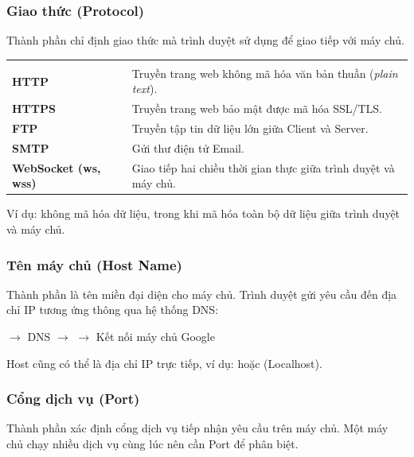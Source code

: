 \subsubsection{Giao thức (Protocol)}
Thành phần  chỉ định giao thức mà trình duyệt sử dụng để giao tiếp với máy chủ.

\begin{prettyTableBox}
\begin{tabularx}{\linewidth}{>{\bfseries\color{primaryBlue}}C{3.2cm} Z}
 &  \\
HTTP & Truyền trang web không mã hóa văn bản thuần (\textit{plain text}). \\
HTTPS & Truyền trang web bảo mật được mã hóa SSL/TLS. \\
FTP & Truyền tập tin dữ liệu lớn giữa Client và Server. \\
SMTP & Gửi thư điện tử Email. \\
WebSocket (ws, wss) & Giao tiếp hai chiều thời gian thực giữa trình duyệt và máy chủ. \\
\end{tabularx}
\end{prettyTableBox}

Ví dụ:  không mã hóa dữ liệu, trong khi  mã hóa toàn bộ dữ liệu giữa trình duyệt và máy chủ.

\subsubsection{Tên máy chủ (Host Name)}
Thành phần  là tên miền đại diện cho máy chủ. Trình duyệt gửi yêu cầu đến địa chỉ IP tương ứng thông qua hệ thống DNS:
\begin{center}
 \quad $\rightarrow$ \quad DNS \quad $\rightarrow$ \quad {} \quad $\rightarrow$ \quad Kết nối máy chủ Google
\end{center}
Host cũng có thể là địa chỉ IP trực tiếp, ví dụ:  hoặc  (Localhost).

\subsubsection{Cổng dịch vụ (Port)}
Thành phần  xác định cổng dịch vụ tiếp nhận yêu cầu trên máy chủ. Một máy chủ chạy nhiều dịch vụ cùng lúc nên cần Port để phân biệt.

